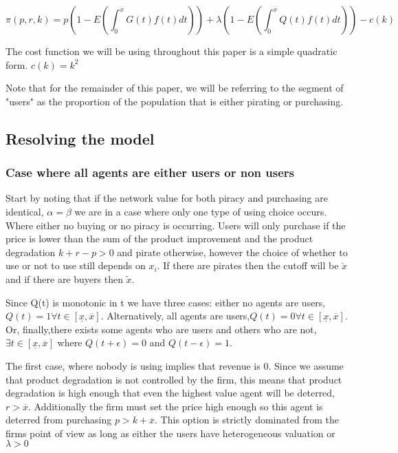 \documentclass{article}
\begin{document}
\begin{equation} \label{eq:profit1}
\pi(p,r,k) 
=p\left(1-E\left(\int^{\overline{x}}_{0}G(t)f(t)dt\right)\right) + \lambda \left(1-E\left(\int^{\overline{x}}_{0}Q(t)f(t)dt\right)\right)- c(k) 
\end{equation}

The cost function we will be using throughout this paper is a simple quadratic form. $c(k)= k^2$

Note that for the remainder of this paper, we will be referring to the segment of "users" as the proportion of the population that is either pirating or purchasing.

\subsection{Resolving the model}

\subsubsection{Case where all agents are either users or non users}

Start by noting that if the network value for both piracy  and purchasing are identical, $\alpha = \beta$ we are in a case where only one type of using choice occurs. Where either no buying or no piracy is occurring. Users will only purchase if the price is lower than the sum of the product improvement and the product degradation $k+r-p > 0$ and pirate otherwise, however the choice of whether to use or not to use still depends on $x_i$. If there are pirates then the cutoff will be $\check{x}$ and if there are buyers then $\tilde{x}$.  

Since Q(t) is monotonic in t we have three cases: either no agents are users,$Q(t) = 1 \forall t \in [\underline{x},\overline{x}]$. Alternatively, all agents are users,$Q(t)=0 \forall t \in [\underline{x},\overline{x}]$. Or, finally,there exists some agents who are users and others who are not,$\exists t \in [\underline{x},\overline{x}]$ where $Q(t+\epsilon)=0$ and $Q(t-\epsilon)=1$.

The first case, where nobody is using implies that revenue is 0. Since we assume that product degradation is not controlled by the firm, this means that product degradation is high enough that even the highest value agent will be deterred, $r>\overline{x}$. Additionally the firm must set the price high enough so this agent is deterred from purchasing $p>k+\overline{x}$. This option is strictly dominated from the firms point of view as long as either the users have heterogeneous valuation or $\lambda>0$
\end{document}
